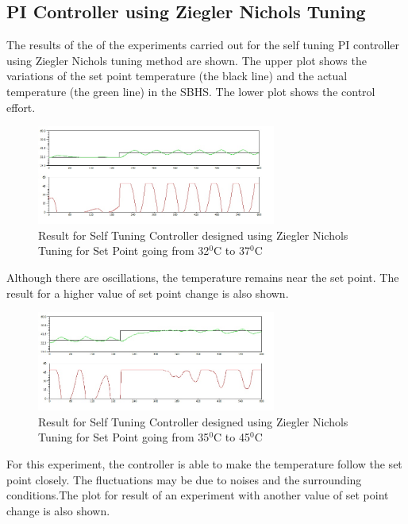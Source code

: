 \subsection{PI Controller using Ziegler Nichols Tuning}
The results of the of the experiments carried out for the self tuning PI controller using Ziegler Nichols tuning method are shown. The upper plot shows the variations of the set point temperature (the black line) and the actual temperature (the green line) in the SBHS. The lower plot shows the control effort.
\begin{figure}[h]
	
		\centering
\includegraphics[width=0.7\textwidth]{Vikas_self/report_tex/PID_results/self_tuning/NewSetpoint_change/PI/step32to37.jpg}
		\caption{Result for Self Tuning Controller designed using Ziegler Nichols Tuning for Set Point going from 32$^0$C to 37$^0$C}
\end{figure}

Although there are oscillations, the temperature remains near the set point. The result for a higher value of set point change is also shown.
\begin{figure}[h]
	\centering
\includegraphics[width=0.7\textwidth]{Vikas_self/report_tex/PID_results/self_tuning/NewSetpoint_change/PI/step35to45.jpg}
		\caption{Result for Self Tuning Controller designed using Ziegler Nichols Tuning for Set Point going from 35$^0$C to 45$^0$C}

	
\end{figure}

For this experiment, the controller is able to make the temperature follow the set point closely. The fluctuations may be due to noises and the surrounding conditions.The plot for result of an experiment with another value of set point change is also shown.

